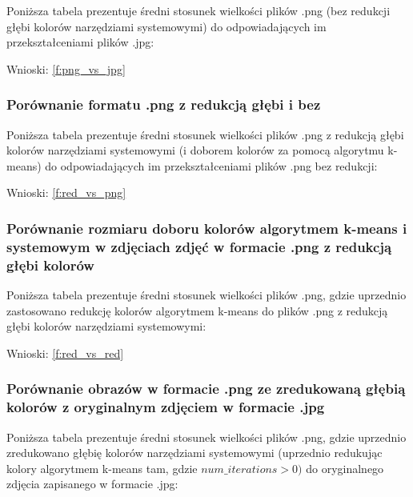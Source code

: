 Poniższa tabela prezentuje średni stosunek wielkości plików .png (bez redukcji głębi kolorów narzędziami systemowymi) do odpowiadających im przekształceniami plików .jpg:
\begin{figure}[H]
	
\end{figure}

Wnioski: \ref{f:png_vs_jpg}


\subsubsection{Porównanie formatu .png z redukcją głębi i bez}

\label{m:red_vs_png}
Poniższa tabela prezentuje średni stosunek wielkości plików .png z redukcją głębi kolorów narzędziami systemowymi (i doborem kolorów za pomocą algorytmu k-means) do odpowiadających im przekształceniami plików .png bez redukcji:
\begin{figure}[H]
	
\end{figure}

Wnioski: \ref{f:red_vs_png}

\subsubsection{Porównanie rozmiaru doboru kolorów algorytmem k-means i systemowym w zdjęciach zdjęć w formacie .png z redukcją głębi kolorów}

\label{m:red_vs_red}

Poniższa tabela prezentuje średni stosunek wielkości plików .png, gdzie uprzednio zastosowano redukcję kolorów algorytmem k-means do plików .png z redukcją głębi kolorów narzędziami systemowymi:

\begin{figure}[H]
	
\end{figure}

Wnioski: \ref{f:red_vs_red}

\subsubsection{Porównanie obrazów w formacie .png ze zredukowaną głębią kolorów z oryginalnym zdjęciem w formacie .jpg}

\label{m:red_vs_jpg}

Poniższa tabela prezentuje średni stosunek wielkości plików .png, gdzie uprzednio zredukowano głębię kolorów narzędziami systemowymi (uprzednio redukując kolory algorytmem k-means tam, gdzie $num\_iterations > 0)$ do oryginalnego zdjęcia zapisanego w formacie .jpg:

